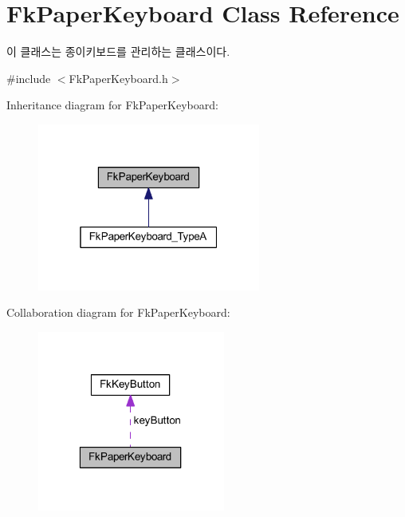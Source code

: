 \hypertarget{class_fk_paper_keyboard}{}\section{Fk\+Paper\+Keyboard Class Reference}
\label{class_fk_paper_keyboard}


이 클래스는 종이키보드를 관리하는 클래스이다.  




{\ttfamily \#include $<$Fk\+Paper\+Keyboard.\+h$>$}



Inheritance diagram for Fk\+Paper\+Keyboard\+:\nopagebreak
\begin{figure}[H]
\begin{center}
\leavevmode
\includegraphics[width=208pt]{class_fk_paper_keyboard__inherit__graph}
\end{center}
\end{figure}


Collaboration diagram for Fk\+Paper\+Keyboard\+:\nopagebreak
\begin{figure}[H]
\begin{center}
\leavevmode
\includegraphics[width=175pt]{class_fk_paper_keyboard__coll__graph}
\end{center}
\end{figure}
